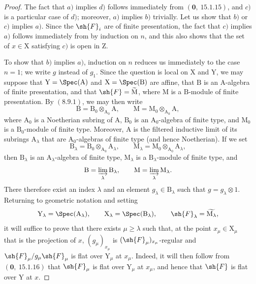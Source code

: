 \begin{proof}
The fact that $a)$ implies $d)$ follows immediately from $(\mathbf{0},~15.1.15)$, and $c)$ is a particular case of $d)$; moreover, $a)$ implies $b)$ trivially. Let us show that $b)$ or $c)$ implies $a)$. Since the $\sh{F}_i$ are of finite presentation, the fact that $c)$ implies $a)$ follows immediately from  by induction on $n$, and this also shows that the set of $x\in\mathrm{X}$ satisfying $c)$ is open in $\mathrm{Z}$.

To show that $b)$ implies $a)$, induction on $n$ reduces us immediately to the case $n=1$; we write $g$ instead of $g_1$. Since the question is local on $\mathrm{X}$ and $\mathrm{Y}$, we may suppose that $\mathrm{Y}=\Spec(\mathrm{A})$ and $\mathrm{X}=\Spec(\mathrm{B})$ are affine, that $\mathrm{B}$ is an $\mathrm{A}$-algebra of finite presentation, and that $\sh{F}=\widetilde{\mathrm{M}}$, where $\mathrm{M}$ is a $\mathrm{B}$-module of finite presentation. By $(8.9.1)$, we may then write
\[
  \mathrm{B}=\mathrm{B}_0\otimes_{\mathrm{A}_0}\mathrm{A},
  \qquad
  \mathrm{M}=\mathrm{M}_0\otimes_{\mathrm{A}_0}\mathrm{A},
\]
where $\mathrm{A}_0$ is a Noetherian subring of $\mathrm{A}$, $\mathrm{B}_0$ is an $\mathrm{A}_0$-algebra of finite type, and $\mathrm{M}_0$ is a $\mathrm{B}_0$-module of finite type. Moreover, $\mathrm{A}$ is the filtered inductive limit of its subrings $\mathrm{A}_\lambda$ that are $\mathrm{A}_0$-algebras of finite type (and hence Noetherian). If we set
\[
  \mathrm{B}_\lambda=\mathrm{B}_0\otimes_{\mathrm{A}_0}\mathrm{A}_\lambda,
  \qquad
  \mathrm{M}_\lambda=\mathrm{M}_0\otimes_{\mathrm{A}_0}\mathrm{A}_\lambda,
\]
then $\mathrm{B}_\lambda$ is an $\mathrm{A}_\lambda$-algebra of finite type, $\mathrm{M}_\lambda$ is a $\mathrm{B}_\lambda$-module of finite type, and
\[
  \mathrm{B}=\varinjlim_\lambda\mathrm{B}_\lambda,
  \qquad
  \mathrm{M}=\varinjlim_\lambda\mathrm{M}_\lambda.
\]
There therefore exist an index $\lambda$ and an element $g_\lambda\in\mathrm{B}_\lambda$ such that $g=g_\lambda\otimes 1$. Returning to geometric notation and setting
\[
  \mathrm{Y}_\lambda=\Spec(\mathrm{A}_\lambda),
  \qquad
  \mathrm{X}_\lambda=\Spec(\mathrm{B}_\lambda),
  \qquad
  \sh{F}_\lambda=\widetilde{\mathrm{M}_\lambda},
\]
it will suffice to prove that there exists $\mu\geqslant\lambda$ such that, at the point $x_\mu\in\mathrm{X}_\mu$ that is the projection of $x$, $(g_\mu)_{x_\mu}$ is $(\sh{F}_\mu)_{x_\mu}$-regular and $\sh{F}_\mu/g_\mu\sh{F}_\mu$ is flat over $\mathrm{Y}_\mu$ at $x_\mu$. Indeed, it will then follow from $(\mathbf{0},~15.1.16)$ that $\sh{F}_\mu$ is flat over $\mathrm{Y}_\mu$ at $x_\mu$, and hence that $\sh{F}$ is flat over $\mathrm{Y}$ at $x$.


\end{proof}
